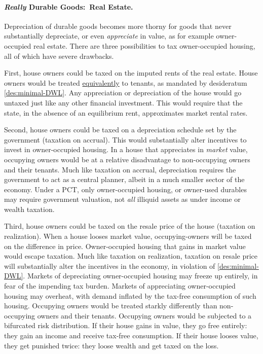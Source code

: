 \paragraph{\emph{Really} Durable Goods:~Real Estate.}
Depreciation of durable goods becomes more thorny for goods that never substantially depreciate, or even \emph{appreciate} in value, as for example owner-occupied real estate.
There are three possibilities to tax owner-occupied housing, all of which have severe drawbacks.

First, house owners could be taxed on the imputed rents of the real estate.
House owners would be treated \hyperref[des:minimal-DWL]{equivalently} to tenants, as mandated by desideratum \ref{des:minimal-DWL}.
Any appreciation or depreciation of the house would go untaxed just like any other financial investment.
This would require that the state, in the absence of an equilibrium rent, approximates market rental rates.

Second, house owners could be taxed on a depreciation schedule set by the government (taxation on accrual).
This would substantially alter incentives to invest in owner-occupied housing.
In a house that appreciates in \emph{market} value, occupying owners would be at a relative disadvantage to non-occupying owners and their tenants.
Much like taxation on accrual, depreciation requires the government to act as a central planner, albeit in a much smaller sector of the economy.
Under a PCT, only owner-occupied housing, or owner-used durables may require government valuation, not \emph{all} illiquid assets as under income or wealth taxation.

Third, house owners could be taxed on the resale price of the house (taxation on realization).
When a house looses market value, occupying-owners will be taxed on the difference in price.
Owner-occupied housing that gains in market value would escape taxation.
Much like taxation on realization, taxation on resale price will substantially alter the incentives in the economy, in violation of \ref{des:minimal-DWL}.
Markets of depreciating owner-occupied housing may freeze up entirely, in fear of the impending tax burden.
Markets of appreciating owner-occupied housing may overheat, with demand inflated by the tax-free consumption of such housing.
Occupying owners would be treated starkly differently than non-occupying owners and their tenants.
Occupying owners would be subjected to a bifurcated risk distribution.
If their house gains in value, they go free entirely:
they gain an income and receive tax-free consumption.
If their house looses value, they get punished twice:
they loose wealth and get taxed on the loss.

